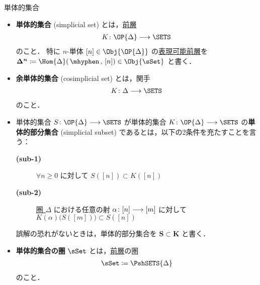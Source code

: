 \documentclass[TQFT_main]{subfiles}
\begin{document}
\begin{mydef}[label=def:SimpSet,breakable]{単体的集合}
    \begin{itemize}
        \item \textbf{単体的集合} (simplicial set)  とは，\hyperref[def:presheaf-general]{前層}
        \begin{align}
            K \colon \OP{\Delta} \lto \SETS
        \end{align}
        のこと．
        特に $n$-単体 $[n] \in \Obj{\OP{\Delta}}$ の\hyperref[def:representable]{表現可能前層}を $\bm{\Delta^n} \coloneqq \Hom{\Delta} (\, \mhyphen \,,\, [n]) \in \Obj{\sSet}$ と書く．

        \item \textbf{余単体的集合} (cosimplicial set) とは，関手
        \begin{align}
            K \colon \Delta \lto \SETS
        \end{align}
        のこと．
        \item 単体的集合 $S \colon \OP{\Delta} \lto \SETS$ が単体的集合 $K \colon \OP{\Delta} \lto \SETS$ の\textbf{単体的部分集合} (simplicial subset) であるとは，以下の2条件を充たすことを言う：
        \begin{description}
            \item[\textbf{(sub-1)}] $\forall n \ge 0$ に対して $S([n]) \subset K([n])$
            \item[\textbf{(sub-2)}] \hyperref[def:simplex-cat]{圏 $\Delta$} における任意の射 $\alpha \colon [n] \longrightarrow [m]$ に対して $K(\alpha) \bigl( S([m]) \bigr) \subset S([n])$
        \end{description}
        誤解の恐れがないときは，単体的部分集合を $\bm{S \subset K}$ と書く．
        \item \textbf{単体的集合の圏} $\sSet$ とは，\hyperref[def:presheaf-general]{前層}の圏
        \begin{align}
            \sSet \coloneqq \PshSETS{\Delta}
        \end{align}
        のこと．
    \end{itemize}

    \tcblower


\end{mydef}
\end{document}

